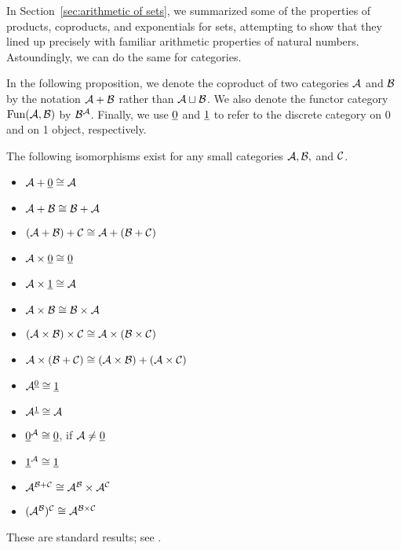 \documentclass[CT4S-EN-RU]{subfiles}
\begin{document}
\begin{blockENG}
In Section~\ref{sec:arithmetic of sets}, we summarized some of the properties of products, coproducts, and exponentials for sets, attempting to show that they lined up precisely with familiar arithmetic properties of natural numbers. Astoundingly, we can do the same for categories.
\end{blockENG}

\begin{blockRUS}
\end{blockRUS}

\begin{blockENG}
In the following proposition, we denote the coproduct of two categories $\mathcal{A}$ and $\mathcal{B}$ by the notation $\mathcal{A}+\mathcal{B}$ rather than $\mathcal{A}\sqcup\mathcal{B}$. We also denote the functor category $\textnormal{Fun}(\mathcal{A},\mathcal{B})$ by $\mathcal{B}^\mathcal{A}$. Finally, we use $\underline{0}$ and $\underline{1}$ to refer to the discrete category on 0 and on 1 object, respectively.
\end{blockENG}

\begin{blockRUS}
\end{blockRUS}

\begin{propositionENG}\label{prop:arithmetic of cats}
The following isomorphisms exist for any small categories $\mathcal{A},\mathcal{B},$ and $\mathcal{C}$.

\begin{itemize}
\item $\mathcal{A}+\underline{0}\cong \mathcal{A}$
\item $\mathcal{A} + \mathcal{B}\cong \mathcal{B} + \mathcal{A}$
\item $(\mathcal{A} + \mathcal{B}) + \mathcal{C} \cong \mathcal{A} + (\mathcal{B} + \mathcal{C})$
\item $\mathcal{A}\times\underline{0}\cong\underline{0}$
\item $\mathcal{A}\times\underline{1}\cong \mathcal{A}$
\item $\mathcal{A}\times \mathcal{B}\cong \mathcal{B}\times \mathcal{A}$
\item $(\mathcal{A}\times\mathcal{B})\times\mathcal{C}\cong\mathcal{A}\times(\mathcal{B}\times\mathcal{C})$
\item $\mathcal{A}\times(\mathcal{B}+\mathcal{C})\cong (\mathcal{A}\times \mathcal{B})+(\mathcal{A}\times \mathcal{C})$
\item $\mathcal{A}^{\underline{0}}\cong \underline{1}$
\item $\mathcal{A}^{\underline{1}}\cong \mathcal{A}$
\item $\underline{0}^\mathcal{A}\cong\underline{0}$,\;\; if $\mathcal{A}\neq\underline{0}$
\item $\underline{1}^\mathcal{A}\cong\underline{1}$
\item $\mathcal{A}^{\mathcal{B}+\mathcal{C}}\cong \mathcal{A}^\mathcal{B}\times \mathcal{A}^\mathcal{C}$
\item $(\mathcal{A}^\mathcal{B})^\mathcal{C}\cong \mathcal{A}^{\mathcal{B}\times \mathcal{C}}$
\end{itemize}
\end{propositionENG}

\begin{propositionRUS}\label{prop:arithmetic of cats}
\end{propositionRUS}

\begin{proofENG}
These are standard results; see \cite{Mac}.
\end{proofENG}

\begin{proofRUS}
\end{proofRUS}
\end{document}

